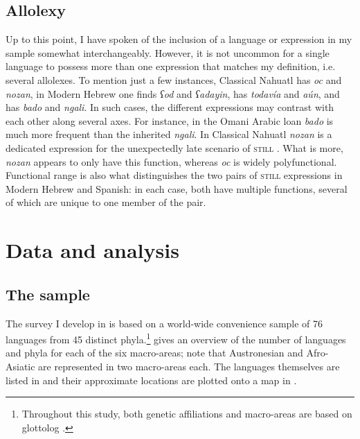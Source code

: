 \subsection{Allolexy}\label{sectionAllolexy}
Up to this point, I have spoken of the inclusion of a language or expression in my sample somewhat interchangeably. However, it is not uncommon for a single language to possess more than one expression that matches my definition, i.e. several allolexes. To mention just a few instances, Classical Nahuatl has \textit{oc} and \textit{nozan}, in Modern Hebrew one finds \textit{ʕod} and \textit{ʕadayin},  has \textit{todavía} and \textit{aún}, and  has \textit{bado} and \textit{ngali}. In such cases, the different expressions may contrast with each other along several axes. For instance, in  the Omani Arabic loan \textit{bado} is much more frequent than the inherited \textit{ngali}. In Classical Nahuatl \textit{nozan} is a dedicated expression for the unexpectedly late scenario of \textsc{still} \parencite[76]{vanBaar1997}. What is more, \textit{nozan} appears to only have this function, whereas \textit{oc} is widely polyfunctional. Functional range is also what distinguishes the two pairs of \textsc{still} expressions in Modern Hebrew and Spanish: in each case, both have multiple functions, several of which are unique to one member of the pair.

\section{Data and analysis}
\label{sectionDataCollectionAnalysis}
\subsection{The sample}\label{sectionSample}
The survey I develop in  is based on a world-wide convenience sample of 76 languages from 45 distinct phyla.\footnote{Throughout this study, both genetic affiliations and macro-areas are based on glottolog \parencite{glottolog}.}  gives an overview of the number of languages and phyla for each of the six macro-areas; note that Austronesian and Afro-Asiatic are represented in two macro-areas each. The languages themselves are listed in  and their approximate locations are plotted onto a map in .

